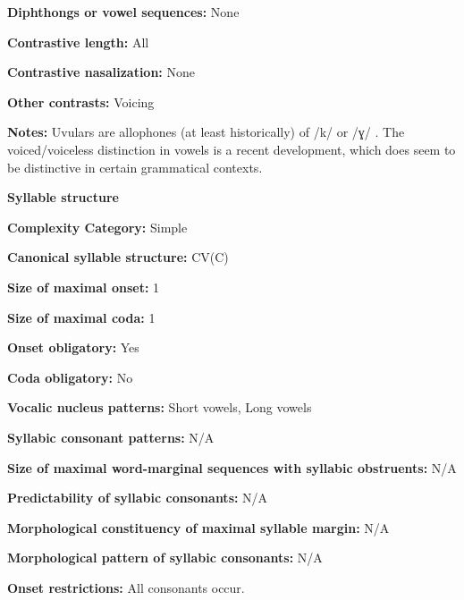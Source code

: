 \textbf{Diphthongs or vowel sequences:} None



\textbf{Contrastive length:} All



\textbf{Contrastive nasalization:} None



\textbf{Other contrasts:} Voicing



\textbf{Notes:} Uvulars are allophones (at least historically) of /k/ or /ɣ/ \citep[26]{Givón2011}. The voiced/voiceless distinction in vowels is a recent development, which does seem to be distinctive in certain grammatical contexts.



\textbf{Syllable structure}



\textbf{Complexity Category:} Simple



\textbf{Canonical syllable structure:} CV(C) \citep[27-28]{Givón2011}



\textbf{Size of maximal onset:} 1



\textbf{Size of maximal coda:} 1



\textbf{Onset obligatory:} Yes



\textbf{Coda obligatory:} No



\textbf{Vocalic nucleus patterns:} Short vowels, Long vowels



\textbf{Syllabic consonant patterns:} N/A



\textbf{Size of maximal word{}-marginal sequences with syllabic obstruents:} N/A



\textbf{Predictability of syllabic consonants:} N/A



\textbf{Morphological constituency of maximal syllable margin:} N/A



\textbf{Morphological pattern of syllabic consonants:} N/A



\textbf{Onset restrictions:} All consonants occur.



